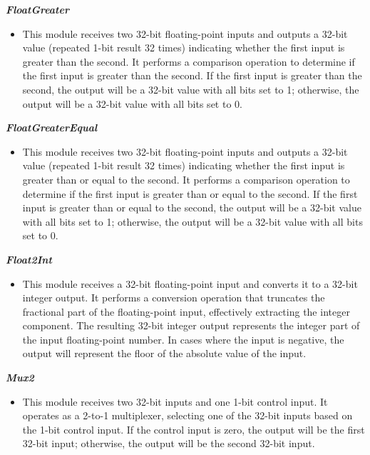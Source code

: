 \documentclass{article}
\begin{document}
\vspace{0.5cm}

\textbf{\textit{FloatGreater}}
\begin{itemize}
\item  This module receives two 32-bit floating-point inputs and outputs a 32-bit value (repeated 1-bit result 32 times) indicating whether the first input is greater than the second. It performs a comparison operation to determine if the first input is greater than the second.
If the first input is greater than the second, the output will be a 32-bit value with all bits set to 1; otherwise, the output will be a 32-bit value with all bits set to 0.
\end{itemize}

\vspace{0.5cm}

\textbf{\textit{FloatGreaterEqual}}
\begin{itemize}
\item  This module receives two 32-bit floating-point inputs and outputs a 32-bit value (repeated 1-bit result 32 times) indicating whether the first input is greater than or equal to the second. It performs a comparison operation to determine if the first input is greater than or equal to the second.
If the first input is greater than or equal to the second, the output will be a 32-bit value with all bits set to 1; otherwise, the output will be a 32-bit value with all bits set to 0.
\end{itemize}

\vspace{0.5cm}

\textbf{\textit{Float2Int}}
\begin{itemize}
\item  This module receives a 32-bit floating-point input and converts it to a 32-bit integer output. It performs a conversion operation that truncates the fractional part of the floating-point input, effectively extracting the integer component. The resulting 32-bit integer output represents the integer part of the input floating-point number. In cases where the input is negative, the output will represent the floor of the absolute value of the input.
\end{itemize}

\vspace{0.5cm}

\textbf{\textit{Mux2}}
\begin{itemize}
\item  This module receives two 32-bit inputs and one 1-bit control input. It operates as a 2-to-1 multiplexer, selecting one of the 32-bit inputs based on the 1-bit control input. 
If the control input is zero, the output will be the first 32-bit input; otherwise, the output will be the second 32-bit input.
\end{itemize}
\end{document}
